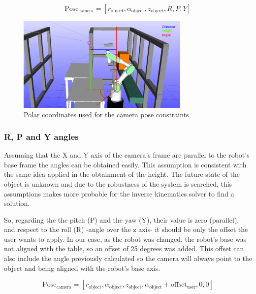 		\begin{equation}
			\label{eq:cameras_pose_noRPY}
			\mathrm{Pose}_{\mathrm{camera}} = [r_{\mathrm{object}},\alpha_{\mathrm{object}},z_{\mathrm{object}},R,P,Y]
		\end{equation}
	\begin{figure}[htb]
	 	\centering
	 	\includegraphics[width=0.75\textwidth]{figures/path_planning_constraints}
	 	\caption{Polar coordinates used for the camera pose constraints}
	 	\label{fig:path_planning_constraints}
	 \end{figure}

	\subsubsection{R, P and Y angles} %
	\label{subsub:r_p_and_y_angles}
	Assuming that the X and Y axis of the camera's frame are parallel to the robot's base frame the angles can be obtained easily.
	This assumption is consistent with the same idea applied in the obtainment of the height.
	The future state of the object is unknown and due to the robustness of the system is searched, this assumptions makes more probable for the inverse kinematics solver to find a solution.


	So, regarding the the pitch (P) and the yaw (Y), their value is zero (parallel), and respect to the roll (R) -angle over the z axis- it should be only the offset the user wants to apply.
	In our case, as the robot was changed, the robot's base was not aligned with the table, so an offset of 25 degrees was added.
	This offset can also include the angle previously calculated so the camera will always point to the object and being aligned with the robot's base axis.

		\begin{equation}
			\label{eq:cameras_pose}
			\mathrm{Pose}_{\mathrm{camera}} = [r_{\mathrm{object}},\alpha_{\mathrm{object}},z_{\mathrm{object}},\alpha_{\mathrm{object}} + \mathrm{offset}_{\mathrm{user}},0,0]
		\end{equation}

